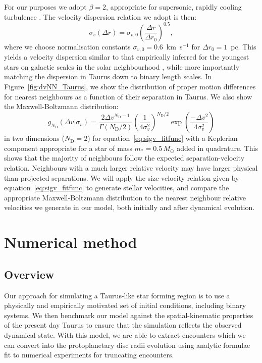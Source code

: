 \documentclass{aa}
\begin{document}
For our purposes we adopt $\beta=2$, appropriate for supersonic, rapidly cooling turbulence \citep{Burgers39}. The velocity dispersion relation we adopt is then:
\begin{equation}
\label{eq:sigv_fitfunc}
    \sigma_v(\Delta r) = \sigma_{v,0} \left(\frac{\Delta r}{\Delta r_0}\right)^{0.5},
\end{equation}where we choose normalisation constants $\sigma_{v,0} = 0.6$~km~s$^{-1}$ for $\Delta r_0 = 1 $~pc. This yields a velocity dispersion similar to that empirically inferred for the youngest stars on galactic scales in the solar neighbourhood \citep[e.g.][]{Holmberg09}, while more importantly matching the dispersion in Taurus down to binary length scales. In Figure~\ref{fig:dvNN_Taurus}, we show the distribution of proper motion differences for nearest neighbours as a function of their separation in Taurus. We also show the Maxwell-Boltzmann distribution:
\begin{equation}
g_{N_\mathrm{D}}(\Delta v | \sigma_v) =  \frac{2 \Delta v^{N_\mathrm{D}-1}}{\Gamma(N_\mathrm{D}/2)} \left(\frac{1}{4\sigma_{v} ^2}\right)^{{N_\mathrm{D}}/2} \exp\left( \frac{-\Delta v^2}{4 \sigma_v^2}\right)
\end{equation}in two dimensions ($N_\mathrm{D} = 2$) for equation~\ref{eq:sigv_fitfunc} with a Keplerian component appropriate for a star of mass $m_* = 0.5 \, M_\odot$ added in quadrature. This shows that the majority of neighbours follow the expected separation-velocity relation. Neighbours with a much larger relative velocity may have larger physical than projected separations. We will apply the size-velocity relation given by equation~\ref{eq:sigv_fitfunc} to generate stellar velocities, and compare the appropriate Maxwell-Boltzmann distribution to the nearest neighbour relative velocities we generate in our model, both initially and after dynamical evolution. 


\section{Numerical method}
\label{sec:method}
\subsection{Overview}

Our approach for simulating a Taurus-like star forming region is to use a physically and empirically motivated set of initial conditions, including binary systems. We then benchmark our model against the spatial-kinematic properties of the present day Taurus to ensure that the simulation reflects the observed dynamical state. With this model, we are able to extract encounters which we can convert into the protoplanetary disc radii evolution using analytic formulae fit to numerical experiments for truncating encounters. 
\end{document}
